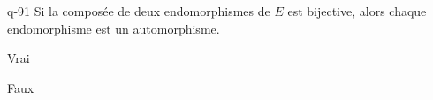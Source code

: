 \begin{truefalse}{q-91}
Si la composée de deux endomorphismes de $E$ est bijective, alors chaque endomorphisme est un automorphisme.
\item Vrai
\item* Faux
\end{truefalse}

